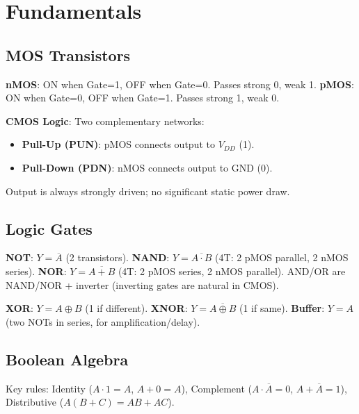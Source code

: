 \section{Fundamentals}

\subsection{MOS Transistors}

\begin{definition}
	\textbf{nMOS}: ON when Gate=1, OFF when Gate=0. Passes strong 0, weak 1.
	\textbf{pMOS}: ON when Gate=0, OFF when Gate=1. Passes strong 1, weak 0.
\end{definition}

\begin{definition}
	\textbf{CMOS Logic}: Two complementary networks:
	\begin{itemize}
		\item \textbf{Pull-Up (PUN)}: pMOS connects output to $V_{DD}$ (1).
		\item \textbf{Pull-Down (PDN)}: nMOS connects output to GND (0).
	\end{itemize}
	Output is always strongly driven; no significant static power draw.
\end{definition}

\subsection{Logic Gates}

\begin{definition}
	\textbf{NOT}: $Y = \overline{A}$ (2 transistors).
	\textbf{NAND}: $Y = \overline{A \cdot B}$ (4T: 2 pMOS parallel, 2 nMOS series).
	\textbf{NOR}: $Y = \overline{A + B}$ (4T: 2 pMOS series, 2 nMOS parallel).
	AND/OR are NAND/NOR + inverter (inverting gates are natural in CMOS).
\end{definition}

\begin{remark}
	\textbf{XOR}: $Y = A \oplus B$ (1 if different).
	\textbf{XNOR}: $Y = \overline{A \oplus B}$ (1 if same).
	\textbf{Buffer}: $Y = A$ (two NOTs in series, for amplification/delay).
\end{remark}

\subsection{Boolean Algebra}

\begin{definition}
	Key rules: Identity ($A \cdot 1 = A$, $A + 0 = A$), Complement ($A \cdot \overline{A} = 0$, $A + \overline{A} = 1$), Distributive ($A(B+C) = AB + AC$).
\end{definition}

